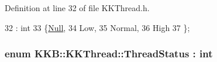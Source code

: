 Definition at line 32 of file K\+K\+Thread.\+h.


\begin{DoxyCode}
32                                : \textcolor{keywordtype}{int} 
33                    \{\hyperlink{namespace_k_k_m_l_l_ad917464bc631109a3021cf02cd27af9aabbb93ef26e3c101ff11cdd21cab08a94}{Null},
34                     Low,
35                     Normal,
36                     High
37                    \};
\end{DoxyCode}
\subsubsection[{\texorpdfstring{Thread\+Status}{ThreadStatus}}]{\setlength{\rightskip}{0pt plus 5cm}enum {\bf K\+K\+B\+::\+K\+K\+Thread\+::\+Thread\+Status} \+: int\hspace{0.3cm}{\ttfamily [strong]}}\hypertarget{class_k_k_b_1_1_k_k_thread_a3f72bb1988ae5dd353b39260ae0acc72}{}\label{class_k_k_b_1_1_k_k_thread_a3f72bb1988ae5dd353b39260ae0acc72}
